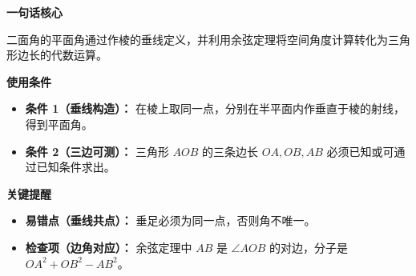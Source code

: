 \begin{summarybox}
	\textbf{\textcolor{CSummary}{一句话核心}}

	二面角的平面角通过作棱的垂线定义，并利用余弦定理将空间角度计算转化为三角形边长的代数运算。

	\medskip
	\textbf{\textcolor{CSummary}{使用条件}}
	\begin{itemize}[leftmargin=*, itemsep=0.5em, topsep=0.4em]
		\item \textbf{条件 1（垂线构造）：} 在棱上取同一点，分别在半平面内作垂直于棱的射线，得到平面角。
		\item \textbf{条件 2（三边可测）：} 三角形 $AOB$ 的三条边长 $OA, OB, AB$ 必须已知或可通过已知条件求出。
	\end{itemize}

	\medskip
	\textbf{\textcolor{CSummary}{关键提醒}}
	\begin{itemize}[leftmargin=*, itemsep=0.5em, topsep=0.4em]
		\item \textbf{易错点（垂线共点）：} 垂足必须为同一点，否则角不唯一。
		\item \textbf{检查项（边角对应）：} 余弦定理中 $AB$ 是 $\angle AOB$ 的对边，分子是 $OA^2+OB^2-AB^2$。
	\end{itemize}
\end{summarybox}
